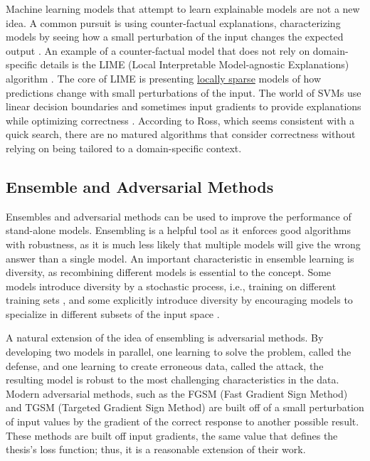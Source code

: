 \documentclass[twoside,11pt]{article}
\begin{document}
Machine learning models that attempt to learn explainable models are not a new idea. A common pursuit is using counter-factual explanations, characterizing models by seeing how a small perturbation of the input changes the expected output \citep{2016:lungberg}. An example of a counter-factual model that does not rely on domain-specific details is the LIME (Local Interpretable Model-agnostic Explanations) algorithm \citep{2016:Ribeioro}. The core of LIME is presenting \underline{locally sparse} models of how predictions change with small perturbations of the input. The world of SVMs use linear decision boundaries and sometimes input gradients to provide explanations while optimizing correctness \citep{2007:zaidan}. According to Ross, which seems consistent with a quick search, there are no matured algorithms that consider correctness without relying on being tailored to a domain-specific context. 

\subsection{Ensemble and Adversarial Methods}
Ensembles and adversarial methods can be used to improve the performance of stand-alone models. Ensembling is a helpful tool as it enforces good algorithms with robustness, as it is much less likely that multiple models will give the wrong answer than a single model. An important characteristic in ensemble learning is diversity, as recombining different models is essential to the concept. Some models introduce diversity by a stochastic process, i.e., training on different training sets \citep{breiman2001random}, and some explicitly introduce diversity by encouraging models to specialize in different subsets of the input space \citep{zhou2018diverse}. 

A natural extension of the idea of ensembling is adversarial methods. By developing two models in parallel, one learning to solve the problem, called the defense, and one learning to create erroneous data, called the attack, the resulting model is robust to the most challenging characteristics in the data. Modern adversarial methods, such as the FGSM (Fast Gradient Sign Method) \citep{goodfellow2014generative} and TGSM (Targeted Gradient Sign Method) \citep{kurakin2016adversarial} are built off of a small perturbation of input values by the gradient of the correct response to another possible result. These methods are built off input gradients, the same value that defines the thesis's loss function; thus, it is a reasonable extension of their work.
\end{document}
